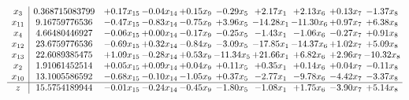\documentclass[9pt]{article}
\begin{document}
\[\begin{array}{c| c c@{\hskip 2pt} c@{\hskip 2pt} c@{\hskip 2pt} c@{\hskip 2pt} c@{\hskip 2pt} c@{\hskip 2pt} c@{\hskip 2pt} c@{\hskip 2pt} }
 x_{3}   &  0.368715083799 & +  0.17 x_{15} & -0.04 x_{14} & +  0.15 x_{9} & -0.29 x_{5} & +  2.17 x_{1} & +  2.13 x_{6} & +  0.13 x_{7} & -1.37 x_{8}\\
 x_{11}   &  9.16759776536 & -0.47 x_{15} & -0.83 x_{14} & -0.75 x_{9} & +  3.96 x_{5} & -14.28 x_{1} & -11.30 x_{6} & +  0.97 x_{7} & +  6.38 x_{8}\\
 x_{4}   &  4.66480446927 & -0.06 x_{15} & +  0.00 x_{14} & -0.17 x_{9} & -0.25 x_{5} & -1.43 x_{1} & -1.06 x_{6} & -0.27 x_{7} & +  0.91 x_{8}\\
 x_{12}   &  23.6759776536 & -0.69 x_{15} & +  0.32 x_{14} & -0.84 x_{9} & -3.09 x_{5} & -17.85 x_{1} & -14.37 x_{6} & +  1.02 x_{7} & +  5.09 x_{8}\\
 x_{13}   &  22.6089385475 & +  1.09 x_{15} & -0.28 x_{14} & +  0.53 x_{9} & -11.34 x_{5} & + 21.66 x_{1} & +  6.82 x_{6} & +  2.96 x_{7} & -10.32 x_{8}\\
 x_{2}   &  1.91061452514 & +  0.05 x_{15} & +  0.09 x_{14} & +  0.04 x_{9} & +  0.11 x_{5} & +  0.35 x_{1} & +  0.14 x_{6} & +  0.04 x_{7} & -0.11 x_{8}\\
 x_{10}   &  13.1005586592 & -0.68 x_{15} & -0.10 x_{14} & -1.05 x_{9} & +  0.37 x_{5} & -2.77 x_{1} & -9.78 x_{6} & -4.42 x_{7} & -3.37 x_{8}\\
\hline
z    &  15.5754189944 & -0.01 x_{15} & -0.24 x_{14} & -0.45 x_{9} & -1.80 x_{5} & -1.08 x_{1} & +  1.75 x_{6} & -3.90 x_{7} & +  5.14 x_{8}\\
\end{array}\]
\end{document}
